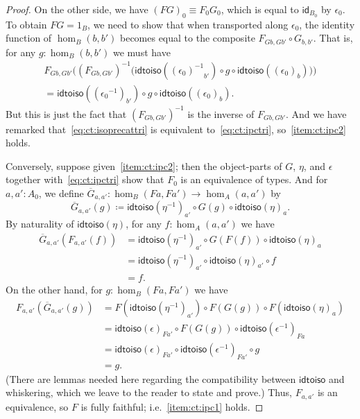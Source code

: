 \documentclass{mscs}
\newcommand{\jdeq}{\equiv}      %
\newcommand{\defeq}{\coloneqq}  %
\newcommand{\opp}[1]{\mathord{{#1}^{-1}}}
\newcommand{\idfunc}[1][]{\ensuremath{\mathsf{id}_{#1}}\xspace}
\numberwithin{equation}{section}
\newcommand{\inv}[1]{{#1}^{-1}}
\newcommand{\idtoiso}{\ensuremath{\mathsf{idtoiso}}\xspace}
\begin{document}
\begin{proof}
  On the other side, we have $(FG)_0\jdeq F_0 G_0$, which is equal to $\idfunc[B_0]$ by $\epsilon_0$.
  To obtain $FG=1_B$, we need to show that when transported along $\epsilon_0$, the identity function of $\hom_B(b,b')$ becomes equal to the composite $F_{Gb,Gb'} \circ G_{b,b'}$.
  That is, for any $g:\hom_B(b,b')$ we must have
  \begin{multline*}
    F_{Gb,Gb'}\Big(\inv{(F_{Gb,Gb'})}\Big(\idtoiso(\opp{(\epsilon_0)}_{b'}) \circ g \circ \idtoiso((\epsilon_0)_b)\Big)\Big)\\
    = \idtoiso((\opp{\epsilon_0})_{b'}) \circ g \circ \idtoiso((\epsilon_0)_b).
  \end{multline*}
  But this is just the fact that $\inv{(F_{Gb,Gb'})}$ is the inverse of $F_{Gb,Gb'}$.
  And we have remarked that~\eqref{eq:ct:isoprecattri} is equivalent to~\eqref{eq:ct:ipctri}, so~\ref{item:ct:ipc2} holds.

  Conversely, suppose given~\ref{item:ct:ipc2}; then the object-parts of $G$, $\eta$, and $\epsilon$ together with~\eqref{eq:ct:ipctri} show that $F_0$ is an equivalence of types.
  And for $a,a':A_0$, we define $\overline{G}_{a,a'}: \hom_B(Fa,Fa') \to \hom_A(a,a')$ by
  \begin{equation}
    \overline{G}_{a,a'}(g) \defeq \idtoiso(\opp{\eta})_{a'} \circ G(g) \circ \idtoiso(\eta)_a.\label{eq:ct:gbar}
  \end{equation}
  By naturality of $\idtoiso(\eta)$, for any $f:\hom_A(a,a')$ we have
  \begin{align*}
    \overline{G}_{a,a'}(F_{a,a'}(f))
    &= \idtoiso(\opp{\eta})_{a'} \circ G(F(f)) \circ \idtoiso(\eta)_a\\
    &= \idtoiso(\opp{\eta})_{a'} \circ \idtoiso(\eta)_{a'} \circ f \\
    &= f.
  \end{align*}
  On the other hand, for $g:\hom_B(Fa,Fa')$ we have
  \begin{align*}
    F_{a,a'}(\overline{G}_{a,a'}(g))
    &= F(\idtoiso(\opp{\eta})_{a'}) \circ F(G(g)) \circ F(\idtoiso(\eta)_a)\\
    &= \idtoiso(\epsilon)_{Fa'}
    \circ F(G(g))
    \circ \idtoiso(\opp{\epsilon})_{Fa}\\
    &= \idtoiso(\epsilon)_{Fa'}
    \circ \idtoiso(\opp{\epsilon})_{Fa'}
    \circ g\\
    &= g.
  \end{align*}
  (There are lemmas needed here regarding the compatibility between \idtoiso and whiskering, which we leave to the reader to state and prove.)
  Thus, $F_{a,a'}$ is an equivalence, so $F$ is fully faithful; i.e.~\ref{item:ct:ipc1} holds.


\end{proof}
\end{document}
